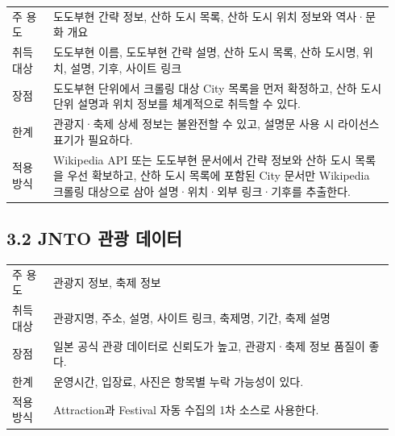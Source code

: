 \documentclass[12pt,a4paper]{article}
\newcommand{\DocNeedspace}[1]{\par\ifdim\dimexpr\pagegoal-\pagetotal\relax<#1\newpage\fi}
\begin{document}
\DocNeedspace{16\baselineskip}
\begin{small}
\begin{longtable}{@{}>{\RaggedRight\arraybackslash}m{0.103\linewidth}>{\RaggedRight\arraybackslash}m{0.837\linewidth}@{}}
\toprule
\multicolumn{1}{>{\centering\arraybackslash}m{0.103\linewidth}}{\textbf{항목}} & \multicolumn{1}{>{\centering\arraybackslash}m{0.837\linewidth}}{\textbf{내용}} \\
\midrule
\endhead
주 용도 & 도도부현 간략 정보, 산하 도시 목록, 산하 도시 위치 정보와 역사·문화 개요 \\
취득 대상 & 도도부현 이름, 도도부현 간략 설명, 산하 도시 목록, 산하 도시명, 위치, 설명, 기후, 사이트 링크 \\
장점 & 도도부현 단위에서 크롤링 대상 City 목록을 먼저 확정하고, 산하 도시 단위 설명과 위치 정보를 체계적으로 취득할 수 있다. \\
한계 & 관광지·축제 상세 정보는 불완전할 수 있고, 설명문 사용 시 라이선스 표기가 필요하다. \\
적용 방식 & Wikipedia API 또는 도도부현 문서에서 간략 정보와 산하 도시 목록을 우선 확보하고, 산하 도시 목록에 포함된 City 문서만 Wikipedia 크롤링 대상으로 삼아 설명·위치·외부 링크·기후를 추출한다. \\
\bottomrule
\end{longtable}
\end{small}


\DocNeedspace{24\baselineskip}
\subsection*{3.2 JNTO 관광 데이터}


\DocNeedspace{16\baselineskip}
\begin{small}
\begin{longtable}{@{}>{\RaggedRight\arraybackslash}m{0.108\linewidth}>{\RaggedRight\arraybackslash}m{0.832\linewidth}@{}}
\toprule
\multicolumn{1}{>{\centering\arraybackslash}m{0.108\linewidth}}{\textbf{항목}} & \multicolumn{1}{>{\centering\arraybackslash}m{0.832\linewidth}}{\textbf{내용}} \\
\midrule
\endhead
주 용도 & 관광지 정보, 축제 정보 \\
취득 대상 & 관광지명, 주소, 설명, 사이트 링크, 축제명, 기간, 축제 설명 \\
장점 & 일본 공식 관광 데이터로 신뢰도가 높고, 관광지·축제 정보 품질이 좋다. \\
한계 & 운영시간, 입장료, 사진은 항목별 누락 가능성이 있다. \\
적용 방식 & Attraction과 Festival 자동 수집의 1차 소스로 사용한다. \\
\bottomrule
\end{longtable}
\end{small}
\end{document}
